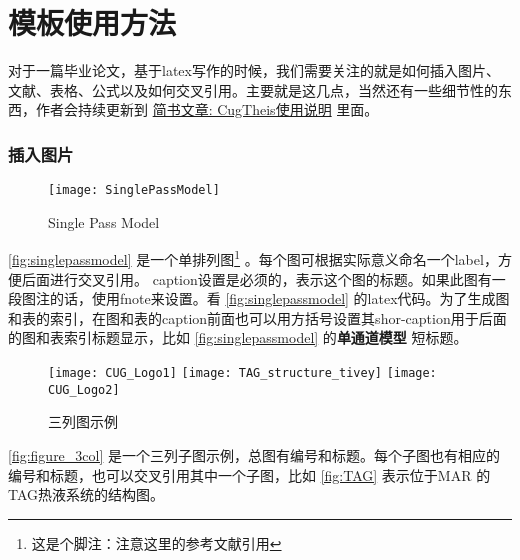 
\chapter{模板使用方法}

对于一篇毕业论文，基于latex写作的时候，我们需要关注的就是如何插入图片、文献、表格、公式以及如何交叉引用。主要就是这几点，当然还有一些细节性的东西，作者会持续更新到 \href{https://www.jianshu.com/p/c9bb775fe0f4}{简书文章: CugTheis使用说明}  里面。

\subsection{插入图片}
\begin{figure} [htbp] 
	\centering
	\texttt{[image: SinglePassModel]} 
	\caption[单通道模型]{Single Pass Model} 
	\label{fig:singlepassmodel} 
\end{figure} 

 \autoref{fig:singlepassmodel} 是一个单排列图\footnote{这是个脚注：注意这里的参考文献引用}
  \citep{andersen2017faulting}。每个图可根据实际意义命名一个label，方便后面进行交叉引用。
  caption设置是必须的，表示这个图的标题。如果此图有一段图注的话，使用fnote来设置。看 \autoref{fig:singlepassmodel} 的latex代码。为了生成图和表的索引，在图和表的caption前面也可以用方括号设置其shor-caption用于后面的图和表索引标题显示，比如  \autoref{fig:singlepassmodel} 的\textbf{单通道模型} 短标题。


\begin{figure} [htbp]
	\centering%
	{\texttt{[image: CUG\_Logo1]} } 
	\hspace{0.01\textwidth} 
	{\texttt{[image: TAG\_structure\_tivey]} } 
		\hspace{0.01\textwidth} 
	{\texttt{[image: CUG\_Logo2]} } 
	\caption{三列图示例} 
	\label{fig:figure_3col} 
\end{figure} 

\autoref{fig:figure_3col} 是一个三列子图示例，总图有编号和标题。每个子图也有相应的编号和标题，也可以交叉引用其中一个子图，比如 \autoref{fig:TAG} 表示位于MAR 的TAG热液系统的结构图。


